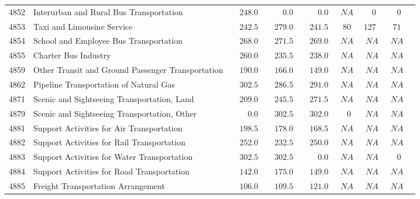 \documentclass[9pt, oneside]{article}   	%
\begin{document}
\begin{longtable}{lp{3.5 in}ccccccc}
4852  & Interurban and Rural Bus Transportation & $\phantom{00}248.0$ & $\phantom{0000}0.0$ & $\phantom{0000}0.0$ & $\phantom{0}NA$ & $\phantom{00}0$ & $\phantom{00}0$ \\
4853  & Taxi and Limousine Service & $\phantom{00}242.5$ & $\phantom{00}279.0$ & $\phantom{00}241.5$ & $\phantom{0}80$ & $127$ & $\phantom{0}71$ \\
4854  & School and Employee Bus Transportation & $\phantom{00}268.0$ & $\phantom{00}271.5$ & $\phantom{00}269.0$ & $\phantom{0}NA$ & $\phantom{0}NA$ & $\phantom{0}NA$ \\
4855  & Charter Bus Industry & $\phantom{00}260.0$ & $\phantom{00}235.5$ & $\phantom{00}238.0$ & $\phantom{0}NA$ & $\phantom{0}NA$ & $\phantom{0}NA$ \\
4859  & Other Transit and Ground Passenger Transportation & $\phantom{00}190.0$ & $\phantom{00}166.0$ & $\phantom{00}149.0$ & $\phantom{0}NA$ & $\phantom{0}NA$ & $\phantom{0}NA$ \\
4862  & Pipeline Transportation of Natural Gas & $\phantom{00}302.5$ & $\phantom{00}286.5$ & $\phantom{00}291.0$ & $\phantom{0}NA$ & $\phantom{0}NA$ & $\phantom{0}NA$ \\
4871  & Scenic and Sightseeing Transportation, Land & $\phantom{00}209.0$ & $\phantom{00}245.5$ & $\phantom{00}271.5$ & $\phantom{0}NA$ & $\phantom{0}NA$ & $\phantom{0}NA$ \\
4879  & Scenic and Sightseeing Transportation, Other & $\phantom{0000}0.0$ & $\phantom{00}302.5$ & $\phantom{00}302.0$ & $\phantom{00}0$ & $\phantom{0}NA$ & $\phantom{0}NA$ \\
4881  & Support Activities for Air Transportation & $\phantom{00}198.5$ & $\phantom{00}178.0$ & $\phantom{00}168.5$ & $\phantom{0}NA$ & $\phantom{0}NA$ & $\phantom{0}NA$ \\
4882  & Support Activities for Rail Transportation & $\phantom{00}252.0$ & $\phantom{00}232.5$ & $\phantom{00}250.0$ & $\phantom{0}NA$ & $\phantom{0}NA$ & $\phantom{0}NA$ \\
4883  & Support Activities for Water Transportation & $\phantom{00}302.5$ & $\phantom{00}302.5$ & $\phantom{0000}0.0$ & $\phantom{0}NA$ & $\phantom{0}NA$ & $\phantom{00}0$ \\
4884  & Support Activities for Road Transportation & $\phantom{00}142.0$ & $\phantom{00}175.0$ & $\phantom{00}149.0$ & $\phantom{0}NA$ & $\phantom{0}NA$ & $\phantom{0}NA$ \\
4885  & Freight Transportation Arrangement & $\phantom{00}106.0$ & $\phantom{00}109.5$ & $\phantom{00}121.0$ & $\phantom{0}NA$ & $\phantom{0}NA$ & $\phantom{0}NA$ \\

\end{longtable}
\end{document}
